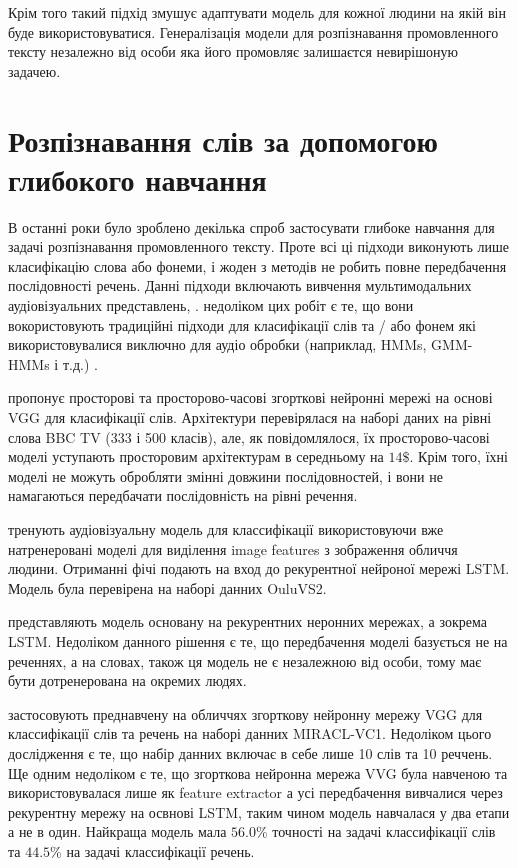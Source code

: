 Крім того такий підхід змушує адаптувати модель для кожної людини на якій він буде використовуватися. Генералізація модели для розпізнавання промовленного тексту незалежно від особи яка його промовляє залишаєтся невирішоную задачею. 

\section{Розпізнавання слів за допомогою глибокого навчання}

В останні роки було зроблено декілька спроб застосувати глибоке навчання для задачі розпізнавання промовленного тексту. Проте всі ці підходи виконують лише класифікацію слова або фонеми, і жоден з методів не робить повне передбачення послідовності речень. Данні підходи включають вивчення мультимодальних аудіовізуальних представлень, \cite{ngiam2011multimodal, sui2015listening, petridis2016deep}. недоліком цих робіт є те, що вони вокористовують традиційні підходи для класифікації слів та / або фонем які використовувалися виключно для аудіо обробки (наприклад, HMMs, GMM-HMMs і т.д.) \cite{almajai:2016, takashima2016audio, noda2014lipreading, koller2015deep}.

\cite{chung2016lip} пропонує просторові та просторово-часові згорткові нейронні мережі на основі VGG для класифікації слів. Архітектури перевірялася на наборі даних на рівні слова BBC TV (333 і 500 класів), але, як повідомлялося, їх просторово-часові моделі уступають просторовим архітектурам в середньому на $ 14 \$$. Крім того, їхні моделі не можуть обробляти змінні довжини послідовностей, і вони не намагаються передбачати послідовність на рівні речення. 

\cite{chung2016out} тренують аудіовізуальну модель для классифікації використовуючи вже натренеровані моделі для виділення image features з зображення обличчя людини. Отриманні фічі подають на вход до рекурентної нейроної мережі LSTM. Модель була перевірена на наборі данних OuluVS2.

\cite{wand2016lipreading} представляють модель основану на рекурентних неронних мережах, а зокрема LSTM. Недоліком данного рішення є те, що передбачення моделі базується не на реченнях, а на словах, також ця модель не є незалежною від особи, тому має бути дотренерована на окремих людях.

\cite{garglip} застосовують преднавчену на обличчях згорткову нейронну мережу VGG для классифікації слів та речень на наборі данних MIRACL-VC1. Недоліком цього дослідження є те, що набір данних включає в себе лише 10 слів та 10 реччень. Ще одним недоліком є те, що згорткова нейронна мережа VVG була навченою та використовувалася лише як feature extractor а усі передбачення вивчалися через рекурентну мережу на освнові LSTM, таким чином модель навчалася у два етапи а не в один. Найкраща модель мала $56.0\%$ точності на задачі классифікації слів та $44.5\%$ на задачі классифікації речень.

